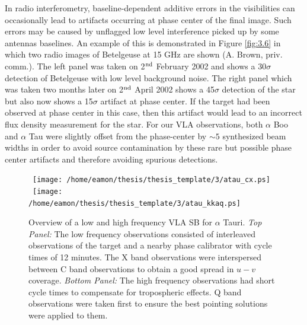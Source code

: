In radio interferometry, baseline-dependent additive errors in the visibilities can occasionally lead to artifacts occurring at phase center of the final image. Such errors may be caused by unflagged low level interference picked up by some antennas baselines. An example of this is demonstrated in Figure \ref{fig:3.6} in which two radio images of Betelgeuse at 15 GHz are shown (A. Brown, priv. comm.). The left panel was taken on 2$^{\rm{nd}}$ February 2002 and shows a 30$\sigma$ detection of Betelgeuse with low level background noise. The right panel which was taken two months later on 2$^{\rm{nd}}$ April 2002 shows a 45$\sigma$ detection of the star but also now shows a 15$\sigma$ artifact at phase center. If the target had been observed at phase center in this case, then this artifact would lead to an incorrect flux density measurement for the star. For our VLA observations, both $\alpha$ Boo and $\alpha$ Tau were slightly offset from the phase-center by $\sim 5$ synthesized beam widths in order to avoid source contamination by these rare but possible phase center artifacts and therefore avoiding spurious detections. 

\begin{figure}[ht!]
\centering 
\mbox{
          \texttt{[image: /home/eamon/thesis/thesis\_template/3/atau\_cx.ps]}}
\mbox{
          \texttt{[image: /home/eamon/thesis/thesis\_template/3/atau\_kkaq.ps]}
          }
\caption[Overview of a low and high frequency VLA observation.]{Overview of a low and high frequency VLA SB for $\alpha$ Tauri. \textit{Top Panel:} The low frequency observations consisted of interleaved
observations of the target and a nearby phase calibrator with cycle times of 12 minutes. The X band observations were interspersed between C band observations to obtain a good spread in $u-v$ coverage. \textit{Bottom Panel:} The high frequency observations had short cycle times to compensate for tropospheric effects. Q band observations were taken first to ensure the best pointing solutions were applied to them. }
\label{fig:3.7}
\end{figure}

